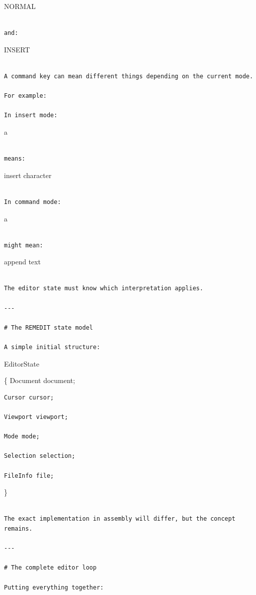 \documentclass[
  oneside,
  openany]{book}
\begin{document}
NORMAL

\begin{verbatim}

and:
\end{verbatim}

INSERT

\begin{verbatim}

A command key can mean different things depending on the current mode.

For example:

In insert mode:
\end{verbatim}

a

\begin{verbatim}

means:
\end{verbatim}

insert character

\begin{verbatim}

In command mode:
\end{verbatim}

a

\begin{verbatim}

might mean:
\end{verbatim}

append text

\begin{verbatim}

The editor state must know which interpretation applies.

---

# The REMEDIT state model

A simple initial structure:
\end{verbatim}

EditorState

\{ Document document;

\begin{verbatim}
Cursor cursor;

Viewport viewport;

Mode mode;

Selection selection;

FileInfo file;
\end{verbatim}

\}

\begin{verbatim}

The exact implementation in assembly will differ, but the concept remains.

---

# The complete editor loop

Putting everything together:
\end{verbatim}
\end{document}
